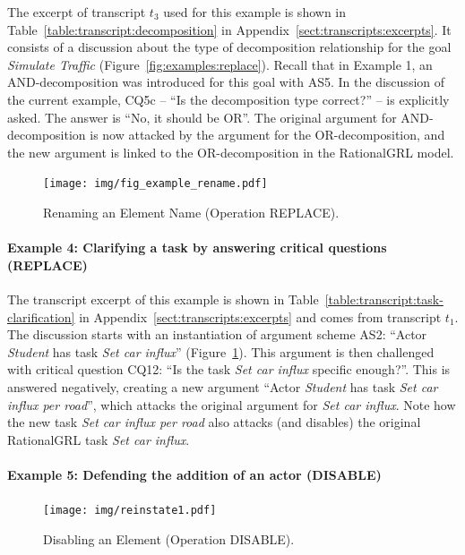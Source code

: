 The excerpt of transcript $t_3$ used for this example is shown in Table~\ref{table:transcript:decomposition} in Appendix~\ref{sect:transcripts:excerpts}. It consists of a discussion about the type of decomposition relationship for the goal \emph{Simulate Traffic} (Figure~\ref{fig:examples:replace}). Recall that in Example 1, an AND-decomposition was introduced for this goal with AS5. In the discussion of the current example, CQ5c -- ``Is the decomposition type correct?'' -- is explicitly asked. The answer is ``No, it should be OR''. The original argument for AND-decomposition is now attacked  by the argument for the OR-decomposition, and the new argument is linked to the OR-decomposition in the RationalGRL model. 


\begin{figure}[b]
\centering
\texttt{[image: img/fig\_example\_rename.pdf]}
\caption{Renaming an Element Name (Operation \textsf{REPLACE)}.}
\label{fig:examples:clarification}
\end{figure}

\paragraph{Example 4: Clarifying a task by answering critical questions (\textsf{REPLACE})}

The transcript excerpt of this example is shown in Table~\ref{table:transcript:task-clarification} in Appendix~\ref{sect:transcripts:excerpts} and comes from transcript $t_1$. The discussion starts with an instantiation of argument scheme AS2: ``Actor \emph{Student} has task \emph{Set car influx}'' (Figure~\ref{fig:examples:clarification}). This argument is then challenged with critical question CQ12: ``Is the task \emph{Set car influx} specific enough?''. This is answered negatively, creating a new argument ``Actor \emph{Student} has task \emph{Set car influx per road}'', which attacks the original argument for \emph{Set car influx}. Note how the new task \emph{Set car influx per road} also attacks (and disables) the original RationalGRL task \emph{Set car influx}. 


\paragraph{Example 5: Defending the addition of an actor (\textsf{DISABLE)}}

\begin{figure}[t]
\centering
\texttt{[image: img/reinstate1.pdf]}
\caption{Disabling an Element (Operation \textsf{DISABLE)}.}
\label{fig:examples:relevant-actor}
\end{figure}

